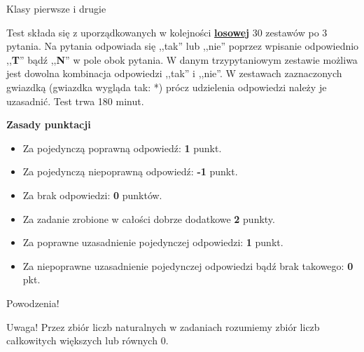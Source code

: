 \documentclass[12pt, a4paper]{article}
\begin{document}
	\begin{center}{}
				\newline \newline Klasy pierwsze i drugie\end{center}
\par
\vspace{0.3cm}
Test składa się z uporządkowanych w kolejności \underline{\textbf{losowej}} 30 zestawów po 3 pytania. Na pytania odpowiada się ,,tak'' lub ,,nie'' poprzez wpisanie odpowiednio ,,\textbf{T}'' bądź ,,\textbf{N}''
w pole obok pytania. W danym trzypytaniowym zestawie możliwa jest dowolna kombinacja
odpowiedzi ,,tak'' i ,,nie''. W zestawach zaznaczonych gwiazdką (gwiazdka wygląda tak: *)
prócz udzielenia odpowiedzi należy je uzasadnić. Test trwa 180 minut.
\vspace{0.5cm}
\par
\textbf{Zasady punktacji}
\begin{itemize}
   \item Za pojedynczą poprawną odpowiedź: \textbf{1} punkt.
   \item Za pojedynczą niepoprawną odpowiedź: \textbf{-1} punkt.
   \item Za brak odpowiedzi: \textbf{0} punktów.
   \item Za zadanie zrobione w całości dobrze dodatkowe \textbf{2} punkty.
   \item Za poprawne uzasadnienie pojedynczej odpowiedzi: \textbf{1} punkt.
   \item Za niepoprawne uzasadnienie pojedynczej odpowiedzi bądź brak takowego: \textbf{0} pkt.
\end{itemize}
	\begin{center}Powodzenia!\end{center}
Uwaga! Przez zbiór liczb naturalnych w zadaniach rozumiemy zbiór liczb całkowitych większych lub równych $0$.
\vspace{0.2cm}

\renewcommand{\labelitemi}{\LARGE{$\square$}}
\newcommand{\normalitem}{\stepcounter{enumi}\item[\textbf{\theenumi. }]}
\newcommand{\asterixitem}{\stepcounter{enumi}\item[\textbf{\theenumi*. }]}
\end{document}
